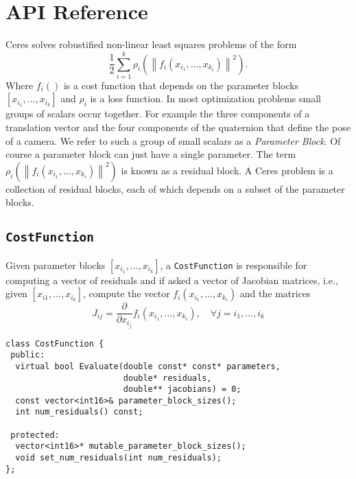 \chapter{API Reference}
\label{chapter:api}
Ceres solves robustified non-linear least squares problems of the form 
\begin{equation}
	\frac{1}{2}\sum_{i=1}^{k} \rho_i\left(\left\|f_i\left(x_{i_1},\hdots,x_{k_i}\right)\right\|^2\right).
	\label{eq:ceresproblem}
\end{equation}
Where $f_i()$ is a  cost function that depends on the parameter blocks $\left[x_{i_1}, \hdots , x_{i_k}\right]$ and  $\rho_i$ is a loss function. In most optimization problems small groups of scalars occur together. For example the three components of a translation vector and the four components of the quaternion that define the pose of a camera. We refer to such a group of small scalars as a {\em Parameter Block}. Of course a parameter block can just have a single parameter. 
The term $ \rho_i\left(\left\|f_i\left(x_{i_1},\hdots,x_{k_i}\right)\right\|^2\right)$ is known as a residual block. A Ceres problem is a collection of residual blocks, each of which depends on a subset of the parameter blocks.


\section{\texttt{CostFunction}}
Given parameter blocks $\left[x_{i_1}, \hdots , x_{i_k}\right]$, a \texttt{CostFunction} is responsible for computing 
a vector of residuals and if asked a vector of Jacobian matrices, i.e., given $\left[x_{i1}, \hdots , x_{i_k}\right]$, compute the vector $f_i\left(x_{i_1},\hdots,x_{k_i}\right)$ and the matrices 
\begin{equation}
J_{ij} = \frac{\partial}{\partial x_{i_j}}f_i\left(x_{i_1},\hdots,x_{k_i}\right),\quad \forall j = i_1,\hdots, i_k
\end{equation}

\begin{verbatim}
class CostFunction {
 public:
  virtual bool Evaluate(double const* const* parameters,
                        double* residuals,
                        double** jacobians) = 0;
  const vector<int16>& parameter_block_sizes(); 
  int num_residuals() const;

 protected:
  vector<int16>* mutable_parameter_block_sizes();
  void set_num_residuals(int num_residuals);
};
\end{verbatim}

